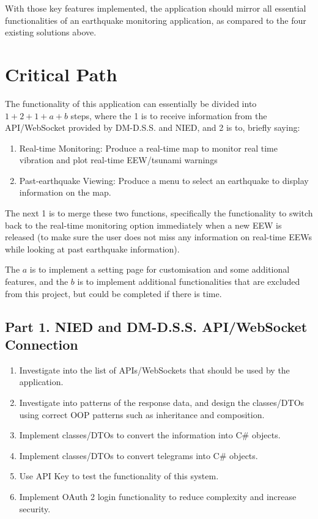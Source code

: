 With those key features implemented, the application should mirror all essential functionalities of an earthquake monitoring application, as compared to the four existing solutions above.

\section{Critical Path}

The functionality of this application can essentially be divided into \(1+2+1+a+b\) steps, where the 1 is to receive information from the API/WebSocket provided by DM-D.S.S. and NIED, and 2 is to, briefly saying:
\begin{enumerate}
    \item Real-time Monitoring: Produce a real-time map to monitor real time vibration and plot real-time EEW/tsunami warnings
    \item Past-earthquake Viewing: Produce a menu to select an earthquake to display information on the map.
\end{enumerate}

The next 1 is to merge these two functions, specifically the functionality to switch back to the real-time monitoring option immediately when a new EEW is released (to make sure the user does not miss any information on real-time EEWs while looking at past earthquake information).

The \(a\) is to implement a setting page for customisation and some additional features, and the \(b\) is to implement additional functionalities that are excluded from this project, but could be completed if there is time.

\subsection{Part 1. NIED and DM-D.S.S. API/WebSocket Connection}
\begin{enumerate}
    \item Investigate into the list of APIs/WebSockets that should be used by the application.
    \item Investigate into patterns of the response data, and design the classes/DTOs using correct OOP patterns such as inheritance and composition.
    \item Implement classes/DTOs to convert the information into C\# objects.
    \item Implement classes/DTOs to convert telegrams into C\# objects.
    \item Use API Key to test the functionality of this system.
    \item Implement OAuth 2 login functionality to reduce complexity and increase security.
\end{enumerate}

